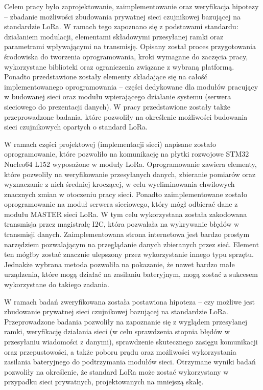 Celem pracy było zaprojektowanie, zaimplementowanie oraz weryfikacja hipotezy -- zbadanie możliwości zbudowania
prywatnej sieci czujnikowej bazującej na standardzie LoRa. W ramach tego zapoznano się z podstawami standardu:
działaniem modulacji, elementami składowymi przesyłanej ramki oraz parametrami wpływającymi na transmisję. Opisany
został proces przygotowania środowiska do tworzenia oprogramowania, kroki wymagane do zaczęcia pracy, wykorzystane
biblioteki oraz ograniczenia związane z wybraną platformą. Ponadto przedstawione zostały elementy składające się na
całość implementowanego oprogramowania -- części dedykowane dla modułów pracujący w budowanej sieci oraz modułu
wpierającego działanie systemu (serwera sieciowego do prezentacji danych). W pracy przedstawione zostały także
przeprowadzone badania, które pozwoliły na określenie możliwości budowania sieci czujnikowych opartych o standard LoRa.

W ramach części projektowej (implementacji sieci) napisane zostało oprogramowanie, które pozwoliło na komunikację na
płytki rozwojowe STM32 Nucleo64 L152 wyposażone w moduły LoRa. Oprogramowanie zawiera elementy, które pozwoliły na
weryfikowanie przesyłanych danych, zbieranie pomiarów oraz wyznaczanie z nich średniej kroczącej, w celu wyeliminowania
chwilowych znacznych zmian w otoczeniu pracy sieci. Ponadto zaimplementowane zostało oprogramowanie na moduł serwera
sieciowego, który mógł odbierać dane z modułu MASTER sieci LoRa. W tym celu wykorzystana została zakodowana transmisja
przez magistralę I2C, która pozwalała na wykrywanie błędów w transmisji danych. Zaimplementowana strona internetowa jest
bardzo prostym narzędziem pozwalającym na przeglądanie danych zbieranych przez sieć. Element ten mógłby zostać znacznie
ulepszony przez wykorzystanie innego typu sprzętu. Jednakże wybrana metoda pozwoliła na pokazanie, że nawet bardzo małe
urządzenia, które mogą działać na zasilaniu bateryjnym, mogą zostać z sukcesem wykorzystane do takiego zadania.

W ramach badań zweryfikowana została postawiona hipoteza -- czy możliwe jest zbudowanie prywatnej sieci czujnikowej
bazującej na standardzie LoRa. Przeprowadzone badania pozwoliły na zapoznanie się z wyglądem przesyłanej ramki,
weryfikację działania sieci (w celu sprawdzenia stopnia błędów w przesyłaniu wiadomości z danymi), sprawdzenie
skutecznego zasięgu komunikacji oraz przepustowości, a także poboru prądu oraz możliwości wykorzystania zasilania
bateryjnego do podtrzymania modułów sieci. Otrzymane wyniki badań pozwoliły na określenie, że standard LoRa może zostać
wykorzystany w przypadku sieci prywatnych, projektowanych na mniejszą skalę.

